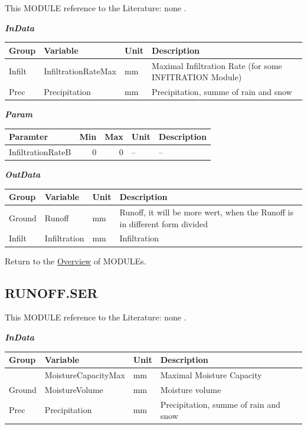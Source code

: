 \documentclass[
]{book}
\begin{document}
This MODULE reference to the Literature: none \citep{none}.

\textbf{\emph{InData}}

\begin{table}[!h]
\centering
\begin{tabular}{l|l|l|l}
\hline
Group & Variable & Unit & Description\\
\hline
Infilt & InfiltrationRateMax & mm & Maximal Infiltration Rate (for some INFITRATION Module)\\
\cline{1-4}
Prec & Precipitation & mm & Precipitation, summe of rain and snow\\
\hline
\end{tabular}
\end{table}

\textbf{\emph{Param}}

\begin{table}[!h]
\centering
\begin{tabular}{l|r|r|l|l}
\hline
Paramter & Min & Max & Unit & Description\\
\hline
InfiltrationRateB & 0 & 0 & -- & --\\
\hline
\end{tabular}
\end{table}

\textbf{\emph{OutData}}

\begin{table}[!h]
\centering
\begin{tabular}{l|l|l|l}
\hline
Group & Variable & Unit & Description\\
\hline
Ground & Runoff & mm & Runoff, it will be more wert, when the Runoff is in different form divided\\
\cline{1-4}
Infilt & Infiltration & mm & Infiltration\\
\hline
\end{tabular}
\end{table}

Return to the \protect\hyperlink{module}{Overview} of MODULEs.

\hypertarget{RUNOFF.SER}{%
\subsection{RUNOFF.SER}\label{RUNOFF.SER}}

This MODULE reference to the Literature: none \citep{none}.

\textbf{\emph{InData}}

\begin{table}[!h]
\centering
\begin{tabular}{l|l|l|l}
\hline
Group & Variable & Unit & Description\\
\hline
 & MoistureCapacityMax & mm & Maximal Moisture Capacity\\
\cline{2-4}
\multirow{-2}{*}{\raggedright\arraybackslash Ground} & MoistureVolume & mm & Moisture volume\\
\cline{1-4}
Prec & Precipitation & mm & Precipitation, summe of rain and snow\\
\hline
\end{tabular}
\end{table}
\end{document}
